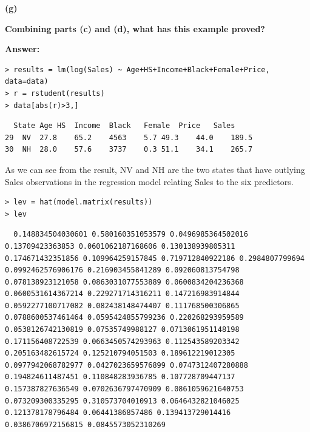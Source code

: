 \documentclass[letterpaper,11pt]{article}
\begin{document}
\begin{addmargin}[-1.1em]{0em}
\textbf{(g)}\par\end{addmargin}
  \textbf{Combining parts (c) and (d), what has this example proved?}\par
\bigbreak
\begin{addmargin}[-0.5em]{0em}
\textbf{Answer: }\end{addmargin}

\begin{lstlisting}
> results = lm(log(Sales) ~ Age+HS+Income+Black+Female+Price, data=data)
> r = rstudent(results)
> data[abs(r)>3,]
\end{lstlisting}

\begin{lstlisting}
  State	Age	HS	Income	Black	Female	Price	Sales
29	NV	27.8	65.2	4563	5.7	49.3	44.0	189.5
30	NH	28.0	57.6	3737	0.3	51.1	34.1	265.7
\end{lstlisting}

As we can see from the result, NV and NH are the two states that have outlying Sales observations in the regression model relating Sales to the six predictors.




\begin{lstlisting}
> lev = hat(model.matrix(results))
> lev
\end{lstlisting}

\begin{lstlisting}
  0.148834504030601 0.580160351053579 0.0496985364502016 0.13709423363853 0.0601062187168606 0.130138939805311 0.174671432351856 0.109964259157845 0.719712840922186 0.2984807799694 0.0992462576906176 0.216903455841289 0.092060813754798 0.078138923121058 0.0863031077553889 0.0600834204236368 0.0600531614367214 0.229271714316211 0.147216983914844 0.0592277100717082 0.082438148474407 0.111768500306865 0.0788600537461464 0.0595424855799236 0.220268293959589 0.0538126742130819 0.07535749988127 0.0713061951148198 0.171156408722539 0.0663450574293963 0.112543589203342 0.205163482615724 0.125210794051503 0.189612219012305 0.0977942068782977 0.0427023659576899 0.0747312407280888 0.194824611487451 0.110848283936785 0.107728709447137 0.157387827636549 0.0702636797470909 0.0861059621640753 0.073209300335295 0.310573704010913 0.0646432821046025 0.121378178796484 0.06441386857486 0.139413729014416 0.0386706972156815 0.0845573052310269
\end{lstlisting}
\end{document}
